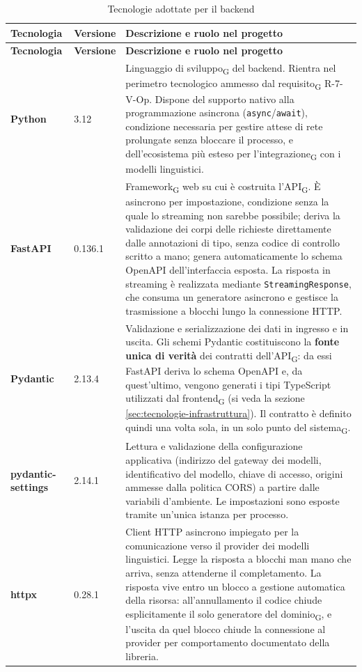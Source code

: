 \documentclass[a4paper, 10pt]{article}
\newcommand{\vPython}{3.12}     %
\newenvironment{tabellatec}[2]{%
  \begingroup
  \small
  \setlength{\tabcolsep}{4pt}
  \begin{longtable}{|p{2.8cm}|p{1.5cm}|p{9.2cm}|}
    \caption{#1}\label{#2}\\
    \hline
    \textbf{Tecnologia} & \textbf{Versione} & \textbf{Descrizione e ruolo nel progetto} \\
    \hline
    \endfirsthead
    \hline
    \textbf{Tecnologia} & \textbf{Versione} & \textbf{Descrizione e ruolo nel progetto} \\
    \hline
    \endhead
}{%
  \end{longtable}
  \endgroup
}
\begin{document}
\begin{tabellatec}{Tecnologie adottate per il backend}{tab:tec-backend}
    \textbf{Python} & \vPython & Linguaggio di sviluppo\textsubscript{G} del backend. Rientra nel perimetro tecnologico ammesso dal requisito\textsubscript{G} R-7-V-Op. Dispone del supporto nativo alla programmazione asincrona (\texttt{async}/\texttt{await}), condizione necessaria per gestire attese di rete prolungate senza bloccare il processo, e dell'ecosistema più esteso per l'integrazione\textsubscript{G} con i modelli linguistici. \\ \hline

    \textbf{FastAPI} & 0.136.1 & Framework\textsubscript{G} web su cui è costruita l'API\textsubscript{G}. È asincrono per impostazione, condizione senza la quale lo streaming non sarebbe possibile; deriva la validazione dei corpi delle richieste direttamente dalle annotazioni di tipo, senza codice di controllo scritto a mano; genera automaticamente lo schema OpenAPI dell'interfaccia esposta. La risposta in streaming è realizzata mediante \texttt{StreamingResponse}, che consuma un generatore asincrono e gestisce la trasmissione a blocchi lungo la connessione HTTP. \\ \hline

    \textbf{Pydantic} & 2.13.4 & Validazione e serializzazione dei dati in ingresso e in uscita. Gli schemi Pydantic costituiscono la \textbf{fonte unica di verità} dei contratti dell'API\textsubscript{G}: da essi FastAPI deriva lo schema OpenAPI e, da quest'ultimo, vengono generati i tipi TypeScript utilizzati dal frontend\textsubscript{G} (si veda la sezione \ref{sec:tecnologie-infrastruttura}). Il contratto è definito quindi una volta sola, in un solo punto del sistema\textsubscript{G}. \\ \hline

    \textbf{pydantic-settings} & 2.14.1 & Lettura e validazione della configurazione applicativa (indirizzo del gateway dei modelli, identificativo del modello, chiave di accesso, origini ammesse dalla politica CORS) a partire dalle variabili d'ambiente. Le impostazioni sono esposte tramite un'unica istanza per processo. \\ \hline

    \textbf{httpx} & 0.28.1 & Client HTTP asincrono impiegato per la comunicazione verso il provider dei modelli linguistici. Legge la risposta a blocchi man mano che arriva, senza attenderne il completamento. La risposta vive entro un blocco a gestione automatica della risorsa: all'annullamento il codice chiude esplicitamente il solo generatore del dominio\textsubscript{G}, e l'uscita da quel blocco chiude la connessione al provider per comportamento documentato della libreria. \\ \hline


\end{tabellatec}
\end{document}
